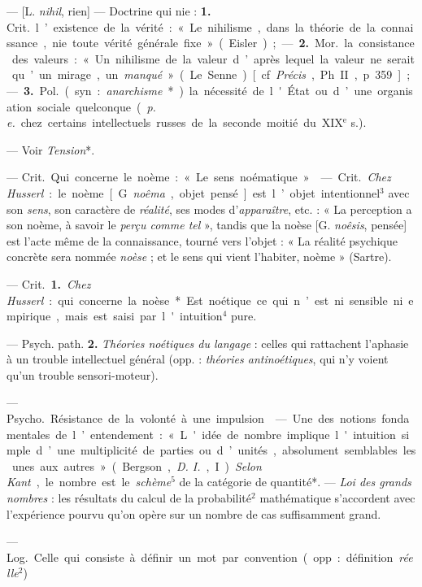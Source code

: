 \begin{itemize}[leftmargin=1cm, label=, itemsep=1pt]
 — [L. {\it nihil}, rien] —  Doctrine qui nie :
{\bf 1.} \si{Crit.} l’existence de la vérité : « Le nihilisme, dans la
théorie de la connaissance, nie toute vérité générale fixe » (Eisler) ; — 
{\bf 2.} \si{Mor.} la consistance des valeurs : « ... Un nihilisme de la
valeur d’après lequel la valeur ne serait qu’un mirage, un {\it manqué} » (Le
Senne) [cf. {\it Précis}, Ph. II, p. 359] ; — {\bf 3.} \si{Pol.} (syn. :
{\it anarchisme}*) la nécessité de l'État ou d’une organisation sociale
quelconque ({\it p. e.} chez certains intellectuels russes de la seconde
moitié du {\footnotesize XIX}$^\text{e}$ s.).

 — Voir {\it Tension}*.

 — \si{Crit.} Qui concerne le noème : « Le sens noématique. »

 — \si{Crit.} {\it Chez Husserl} : le noème [G. {\it noêma},
objet pensé] est l’objet intentionnel$^3$ avec son {\it sens}, son caractère
de {\it réalité}, ses modes d’{\it apparaître}, etc. : « La perception a son
noème, à savoir le {\it perçu comme tel} », tandis que la noèse [G.
{\it noêsis}, pensée] est l’acte même de la connaissance, tourné vers
l'objet : « La réalité psychique concrète sera nommée {\it noèse} ; et le
sens qui vient l'habiter, noème » (Sartre).

 — \si{Crit.} {\bf 1.} {\it Chez Husserl} : qui concerne la
noèse*. Est noétique ce qui n’est ni sensible ni empirique, mais est saisi
par l'intuition$^4$ pure.

— Psych. path. {\bf 2.} {\it Théories noétiques du langage} : celles qui
rattachent l’aphasie à un trouble intellectuel général (opp. : {\it théories
antinoétiques}, qui n’y voient qu'un trouble sensori-moteur).

 — \si{Psycho.} Résistance de la volonté à une impulsion.

 — Une des notions fondamentales de l’entendement : « L'idée de
nombre implique l'intuition simple d’une multiplicité de parties ou d’unités,
absolument semblables les unes aux autres » (Bergson, {\it D. I.}, I).
{\it Selon Kant}, le nombre est le {\it schème}$^5$ de la catégorie de
quantité*. — {\it Loi des grands nombres} : les résultats du calcul de la
probabilité$^2$ mathématique s'accordent avec l'expérience pourvu qu'on opère
sur un nombre de cas suffisamment grand.

 — \si{Log.} Celle qui consiste à définir un mot
par convention (opp. : définition {\it réelle}$^2$)


\end{itemize}
